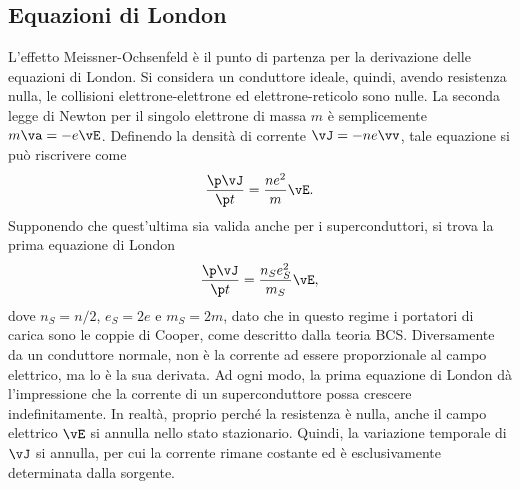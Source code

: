 \subsection{Equazioni di London}
L'effetto Meissner-Ochsenfeld è il punto di partenza per la derivazione delle equazioni di London. Si considera un conduttore ideale, quindi, avendo resistenza nulla, le collisioni elettrone-elettrone ed elettrone-reticolo sono nulle. La seconda legge di Newton per il singolo elettrone di massa $m$ è semplicemente $m\va = -e\vE$. Definendo la densità di corrente $\vJ  = -ne\vv$, tale equazione si può riscrivere come
\begin{equation}
    \frac{\p\vJ}{\p t} = \frac{ne^2}{m}\vE.
\end{equation}
Supponendo che quest'ultima sia valida anche per i superconduttori, si trova la prima equazione di London
\begin{equation}
\label{eq: I equazione di London}
    \frac{\p\vJ}{\p t} = \frac{n_Se^2_S}{m_S}\vE,
\end{equation}
dove $n_S = n/2$, $e_S = 2e$ e $m_S = 2m$, dato che in questo regime i portatori di carica sono le coppie di Cooper, come descritto dalla teoria BCS. Diversamente da un conduttore normale, non è la corrente ad essere proporzionale al campo elettrico, ma lo è la sua derivata. Ad ogni modo, la prima equazione di London dà l'impressione che la corrente di un superconduttore possa crescere indefinitamente. In realtà, proprio perché la resistenza è nulla, anche il campo elettrico $\vE$ si annulla nello stato stazionario. Quindi, la variazione temporale di $\vJ$ si annulla, per cui la corrente rimane costante ed è esclusivamente determinata dalla sorgente. 

